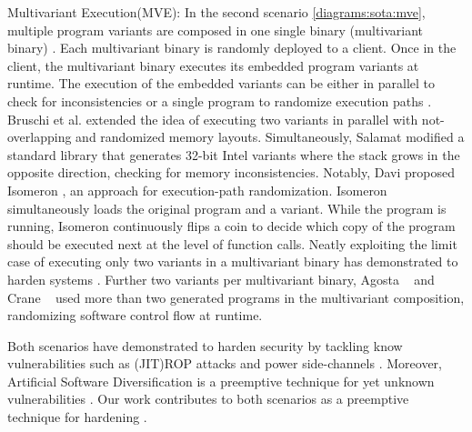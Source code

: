 \begin{usage}{Multivariant Execution(MVE):}
    \label{usage:mve}
    \normalfont
    In the second scenario \autoref{diagrams:sota:mve}, multiple program variants are composed in one single binary (multivariant binary) \cite{cox06}. Each multivariant binary is randomly deployed to a client. Once in the client, the multivariant binary executes its embedded program variants at runtime. 
    The execution of the embedded variants can be either in parallel to check for inconsistencies or a single program to randomize execution paths \cite{bhatkar03}. Bruschi et al. \cite{bruschi2007diversified} extended the idea of executing two variants in parallel with not-overlapping and randomized memory layouts. Simultaneously, Salamat \etal \cite{salamat2007stopping} modified a standard library that generates 32-bit Intel variants where the stack grows in the opposite direction, checking for memory inconsistencies. Notably, Davi \etal proposed Isomeron \cite{davi2015isomeron}, an approach  for execution-path randomization. Isomeron simultaneously loads the original program and a variant. While the program is running, Isomeron continuously flips a coin to decide which copy of the program should be executed next at the level of function calls. 
    Neatly exploiting the limit case of executing only two variants in a multivariant binary has demonstrated to harden systems \cite{salamat2009orchestra, maurer2012tachyon,Kim2015, lu2018stopping, davi2015isomeron}.  Further two variants per multivariant binary,
    Agosta \etal~\cite{agosta2015meet} and Crane \etal~\cite{crane2015thwarting} used more than two generated programs in the multivariant composition, randomizing software control flow at runtime.  
    

    
\end{usage}


Both scenarios have demonstrated to harden security by tackling know vulnerabilities such as (JIT)ROP attacks \cite{jackson2011compiler} and power side-channels \cite{amarilli2011can}. Moreover, Artificial Software Diversification is a preemptive technique for yet unknown vulnerabilities \cite{jackson}. Our work contributes to both scenarios as a preemptive technique for hardening \wasm.

